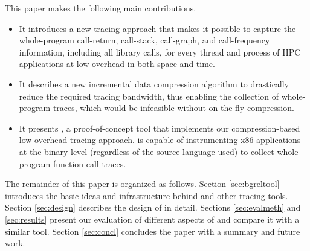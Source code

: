 %
This paper makes the following main contributions.
%
\begin{itemize}
\item It introduces a new tracing approach that makes it possible to capture the whole-program call-return, call-stack, call-graph, and call-frequency information, including all library calls, for every thread and process of HPC applications at low overhead in both space and time.
\item It describes a new incremental data compression algorithm to drastically reduce the required tracing bandwidth, thus enabling the collection of whole-program traces, which would be infeasible without on-the-fly compression.
\item It presents \parlot, a proof-of-concept tool that implements our compression-based low-overhead tracing approach. \parlot is capable of instrumenting x86 applications at the binary level (regardless of the source language used) to collect whole-program function-call traces.
\end{itemize}
%
The remainder of this paper is organized as follows. Section \ref{sec:bgreltool} introduces the basic ideas and infrastructure behind \parlot and other tracing tools. Section \ref{sec:design} describes the design of \parlot in detail. Sections \ref{sec:evalmeth} and \ref{sec:results} present our evaluation of different aspects of \parlot and compare it with a similar tool. Section \ref{sec:concl}
concludes the paper with a summary and future work.




